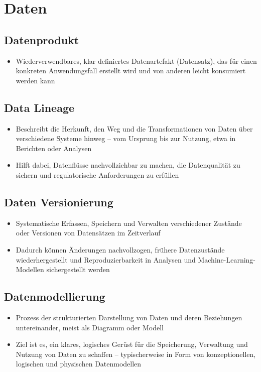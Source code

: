 \documentclass[11pt]{scrartcl}
\begin{document}
\newpage
\section{Daten}
\subsection{Datenprodukt}
\begin{itemize}
	\item Wiederverwendbares, klar definiertes Datenartefakt (Datensatz), das für einen konkreten Anwendungsfall erstellt wird und von anderen leicht konsumiert werden kann
\end{itemize}


\subsection{Data Lineage}
\begin{itemize}
	\item Beschreibt die Herkunft, den Weg und die Transformationen von Daten über verschiedene Systeme hinweg – vom Ursprung bis zur Nutzung, etwa in Berichten oder Analysen
	\item Hilft dabei, Datenflüsse nachvollziehbar zu machen, die Datenqualität zu sichern und regulatorische Anforderungen zu erfüllen
\end{itemize}


\subsection{Daten Versionierung}
\begin{itemize}
	\item Systematische Erfassen, Speichern und Verwalten verschiedener Zustände oder Versionen von Datensätzen im Zeitverlauf
	\item Dadurch können Änderungen nachvollzogen, frühere Datenzustände wiederhergestellt und Reproduzierbarkeit in Analysen und Machine-Learning-Modellen sichergestellt werden
\end{itemize}


\subsection{Datenmodellierung}
\begin{itemize}
	\item Prozess der strukturierten Darstellung von Daten und deren Beziehungen untereinander, meist als Diagramm oder Modell
	\item Ziel ist es, ein klares, logisches Gerüst für die Speicherung, Verwaltung und Nutzung von Daten zu schaffen – typischerweise in Form von konzeptionellen, logischen und physischen Datenmodellen
\end{itemize}
\end{document}
